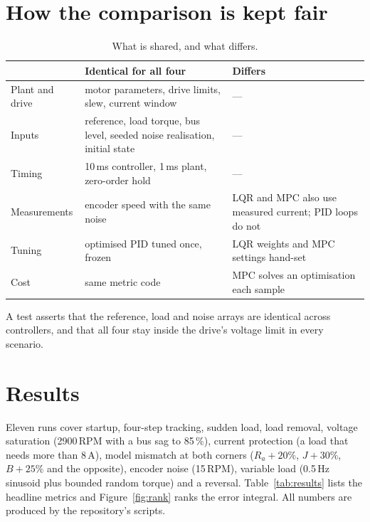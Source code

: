 \documentclass[10pt,a4paper]{article}
\begin{document}
\section{How the comparison is kept fair}
\begin{table}[H]
\centering\small
\caption{What is shared, and what differs.}\label{tab:fair}
\begin{tabular}{@{}p{3.4cm}p{5.2cm}p{5.6cm}@{}}
\toprule
 & Identical for all four & Differs \\
\midrule
Plant and drive & motor parameters, drive limits, slew, current window & --- \\
Inputs & reference, load torque, bus level, seeded noise realisation, initial state & --- \\
Timing & 10\,ms controller, 1\,ms plant, zero-order hold & --- \\
Measurements & encoder speed with the same noise & LQR and MPC also use measured current; PID loops do not \\
Tuning & optimised PID tuned once, frozen & LQR weights and MPC settings hand-set \\
Cost & same metric code & MPC solves an optimisation each sample \\
\bottomrule
\end{tabular}
\end{table}
A test asserts that the reference, load and noise arrays are identical across controllers, and that all four stay inside the drive's
voltage limit in every scenario.

\section{Results}
Eleven runs cover startup, four-step tracking, sudden load, load removal, voltage saturation (2900\,RPM with a bus sag to 85\,\%),
current protection (a load that needs more than 8\,A), model mismatch at both corners ($R_a{+}20\%$, $J{+}30\%$, $B{+}25\%$ and the opposite), encoder noise
(15\,RPM), variable load (0.5\,Hz sinusoid plus bounded random torque) and a reversal. Table~\ref{tab:results} lists the headline metrics and
Figure~\ref{fig:rank} ranks the error integral. All numbers are produced by the repository's scripts.

\begin{table}[H]
\centering\scriptsize
\setlength{\tabcolsep}{3.2pt}
\caption{Error integral, settling time and time in current limit. Shaded cells are the best of the four (no shading when all tie; ``n/a'' means the speed never stayed inside the 2\,\% band).}
\label{tab:results}

\end{table}
\end{document}
